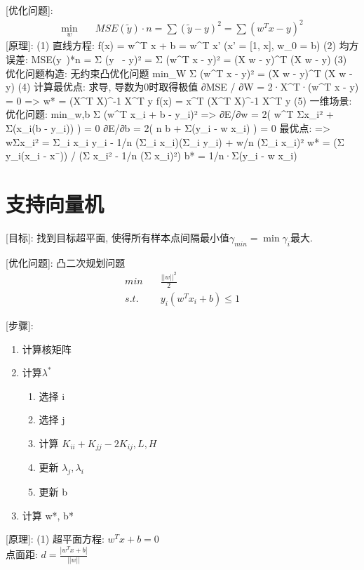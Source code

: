 \documentclass{article}
\begin{document}
		[优化问题]:
    		\begin{align*}
    			\min_w  &\quad	MSE(\tilde y) · n = \sum (\tilde y - y)^2 = \sum (w^T x - y)^2
    		\end{align*}
		[原理]:
			(1) 直线方程: f(x) = w^T x + b = w^T x'		(x' = [1, x], w_0 = b)
			(2) 均方误差:
					MSE(y~)*n = Σ (y~ - y)²
					= Σ (w^T x - y)² = (X w - y)^T (X w - y)
			(3) 优化问题构造: 无约束凸优化问题
					min_W	Σ (w^T x - y)² = (X w - y)^T (X w - y)
			(4) 计算最优点: 求导, 导数为0时取得极值
					∂MSE / ∂W = 2·X^T·(w^T x - y) = 0
				=>	w* = (X^T X)^-1 X^T y
					f(x) = x^T (X^T X)^-1 X^T y
			(5) 一维场景:
				优化问题:
					min_{w,b}	Σ (w^T x_i + b - y_i)²
				=>	∂E/∂w = 2( w^T Σx_i² + Σ(x_i(b - y_i)) )	= 0
					∂E/∂b = 2( n b + Σ(y_i - w x_i) )			= 0
				最优点:
				=>	wΣx_i² = Σ_i x_i y_i - 1/n (Σ_i x_i)(Σ_i y_i) + w/n (Σ_i x_i)²
					w* = (Σ y_i(x_i - x¯)) / (Σ x_i² - 1/n (Σ x_i)²)
					b* = 1/n·Σ(y_i - w x_i)
					
\section{支持向量机}
		[目标]: 找到目标超平面, 使得所有样本点间隔最小值$\gamma_{min} = \min \gamma_i$最大.
		
		[优化问题]: 凸二次规划问题
		    \begin{align*}
		        min     &\quad	\frac{||w||^2}{2}\\
				s.t.    &\quad	y_i (w^T x_i + b) \le 1
		    \end{align*}

		[步骤]:
            \begin{enumerate}
                \item 计算核矩阵
                \item 计算$\lambda^*$
                \begin{enumerate}
                    \item 选择 i
                    \item 选择 j
                    \item 计算 $K_{ii}+K_{jj}-2K_{ij}, L, H$
                    \item 更新 $\lambda_j, \lambda_i$
                    \item 更新 b
                \end{enumerate}
                \item 计算 w*, b*
            \end{enumerate}

		[原理]:
			(1) 超平面方程: $w^T x + b = 0$\\
				点面距: $d = \frac{|w^T x + b|}{||w||}$
				
\end{document}
